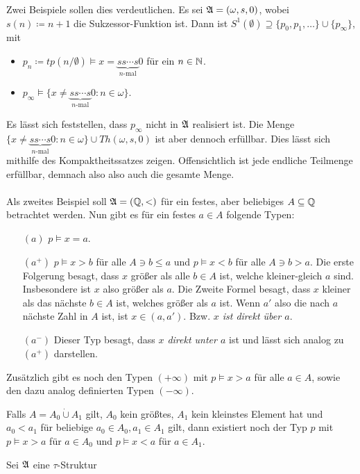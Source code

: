 Zwei Beispiele sollen dies verdeutlichen. Es sei $\mathfrak{A}=(\omega,s,0)$, wobei $s(n)\coloneqq n+1$ die Sukzessor-Funktion ist. Dann ist $S^1(\emptyset)\supseteq\{p_0,p_1,\dots\}\cup\{p_\infty\}$, mit
\begin{itemize}
	\item $p_n\coloneqq tp(n/\emptyset)\models x=\underbrace{ss\cdots s}_{n\text{-mal}}0$ für ein $n\in \mathbb{N}$.
	\item $p_\infty\models\{x\neq\underbrace{ss\cdots s}_{n\text{-mal}}0 : n\in\omega\}$.
\end{itemize}
Es lässt sich feststellen, dass $p_\infty$ nicht in $\mathfrak{A}$ realisiert ist. Die Menge $\{x\neq\underbrace{ss\cdots s}_{n\text{-mal}}0 : n\in\omega\}\cup Th(\omega,s,0)$ ist aber dennoch erfüllbar. Dies lässt sich mithilfe des Kompaktheitssatzes zeigen. Offensichtlich ist jede endliche Teilmenge erfüllbar, demnach also also auch die gesamte Menge.
\\
\\
Als zweites Beispiel soll $\mathfrak{A}=(\mathbb{Q},<)$ für ein festes, aber beliebiges $A\subseteq \mathbb{Q}$ betrachtet werden. Nun gibt es für ein festes $a\in A$ folgende Typen:
\begin{itemize}
	\item[$(a)$] $p\models x=a$.
	\item[$(a^+)$] $p\models x>b$ für alle $A\ni b\leq a$ und $p\models x<b$ für alle $A\ni b>a$. Die erste Folgerung besagt, dass $x$ größer als alle $b\in A$ ist, welche kleiner-gleich $a$ sind. Insbesondere ist $x$ also größer als $a$. Die Zweite Formel besagt, dass $x$ kleiner als das nächste $b\in A$ ist, welches größer als $a$ ist. Wenn $a'$ also die nach $a$ nächste Zahl in $A$ ist, ist $x\in(a,a')$. Bzw. \textit{$x$ ist direkt über $a$}.
	\item[$(a^-)$] Dieser Typ besagt, dass \textit{$x$ direkt unter $a$} ist und lässt sich analog zu $(a^+)$ darstellen.
\end{itemize}
Zusätzlich gibt es noch den Typen $(+\infty)$ mit $p\models x>a$ für alle $a\in A$, sowie den dazu analog definierten Typen $(-\infty)$.

Falls $A=A_0\dot{\cup}A_1$ gilt, $A_0$ kein größtes, $A_1$ kein kleinstes Element hat und $a_0<a_1$ für beliebige $a_0\in A_0,a_1\in A_1$ gilt, dann existiert noch der Typ $p$ mit $p\models x>a$ für $a\in A_0$ und $p\models x<a$ für $a\in A_1$.

\begin{lemma}
	Sei $\mathfrak{A}$ eine $\tau$-Struktur
\end{lemma}
















